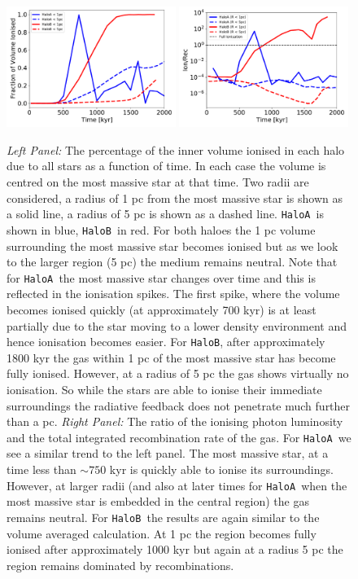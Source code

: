 \documentclass[twocolumn,iop,revtex4]{openjournal}
\newcommand{\ha} {\texttt{HaloA~}}
\newcommand{\hb} {\texttt{HaloB~}}
\newcommand{\hbc} {\texttt{HaloB}}
\begin{document}
\begin{figure}
\centering
\begin{minipage}{175mm}      \begin{center} 
\centerline{
\includegraphics[width=0.49\textwidth]{FIGURES/Ionisation.pdf}
\includegraphics[width=0.49\textwidth]{FIGURES/Recombination.pdf}}
\caption{\textit{Left Panel:} The percentage of the inner volume ionised in each halo
  due to all stars as a function of time. In each case the volume is centred on the
  most massive star at that time. Two radii are considered, a radius of 1 pc from the
  most massive star is shown as a solid line, a radius of 5 pc is shown as a
  dashed line. \ha is shown in blue, \hb in red. For both haloes the 1 pc volume surrounding the
  most massive star becomes ionised but as we look to the 
  larger region (5 pc) the medium remains neutral. Note that for \ha the
  most massive star changes over time and this is reflected in the ionisation spikes.
  The first spike, where the volume becomes ionised quickly (at approximately 700 kyr) is at
  least partially due to the star moving to a lower density environment and hence ionisation
  becomes easier. 
  For \hbc, after approximately 1800 kyr the gas within 1 pc of the most massive star has become
  fully ionised. However, at a radius of 5 pc the gas shows virtually no ionisation. So while the
  stars are able to ionise their immediate surroundings
  the radiative feedback does not penetrate much further than a pc. 
  \textit{Right Panel:} The ratio of the ionising photon luminosity and the total integrated
  recombination rate of the gas. For \ha we see a similar trend to the left panel. The most massive
  star, at a time less than $\sim 750$ kyr is quickly able to ionise its surroundings. However, at
  larger radii (and also at later times for \ha when the most massive star is embedded in the
  central region) the gas remains neutral. 
  For \hb the results are again similar to the volume averaged
  calculation. At 1 pc the region becomes fully ionised after approximately 1000 kyr but again
  at a radius 5 pc the region remains dominated by recombinations.
  }  \label{Fig:Ionisation}
\end{center} \end{minipage}


\end{figure}
\end{document}
